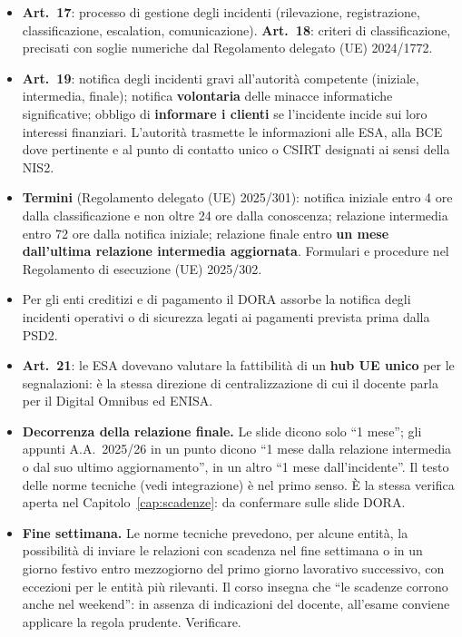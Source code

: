 \begin{integrazione}
\begin{itemize}
  \item \textbf{Art.~17}: processo di gestione degli incidenti (rilevazione, registrazione,
    classificazione, escalation, comunicazione). \textbf{Art.~18}: criteri di classificazione,
    precisati con soglie numeriche dal Regolamento delegato (UE) 2024/1772.
  \item \textbf{Art.~19}: notifica degli incidenti gravi all'autorità competente (iniziale, intermedia,
    finale); notifica \textbf{volontaria} delle minacce informatiche significative; obbligo di
    \textbf{informare i clienti} se l'incidente incide sui loro interessi finanziari. L'autorità
    trasmette le informazioni alle ESA, alla BCE dove pertinente e al punto di contatto unico o CSIRT
    designati ai sensi della NIS2.
  \item \textbf{Termini} (Regolamento delegato (UE) 2025/301): notifica iniziale entro 4 ore dalla
    classificazione e non oltre 24 ore dalla conoscenza; relazione intermedia entro 72 ore dalla
    notifica iniziale; relazione finale entro \textbf{un mese dall'ultima relazione intermedia
    aggiornata}. Formulari e procedure nel Regolamento di esecuzione (UE) 2025/302.
  \item Per gli enti creditizi e di pagamento il DORA assorbe la notifica degli incidenti operativi o
    di sicurezza legati ai pagamenti prevista prima dalla PSD2.
  \item \textbf{Art.~21}: le ESA dovevano valutare la fattibilità di un \textbf{hub UE unico} per le
    segnalazioni: è la stessa direzione di centralizzazione di cui il docente parla per il Digital
    Omnibus ed ENISA.
\end{itemize}
\end{integrazione}

\begin{verifica}
\begin{itemize}
  \item \textbf{Decorrenza della relazione finale.} Le slide dicono solo ``1 mese''; gli appunti
    A.A.~2025/26 in un punto dicono ``1 mese dalla relazione intermedia o dal suo ultimo
    aggiornamento'', in un altro ``1 mese dall'incidente''. Il testo delle norme tecniche (vedi
    integrazione) è nel primo senso. È la stessa verifica aperta nel Capitolo~\ref{cap:scadenze}: da
    confermare sulle slide DORA.
  \item \textbf{Fine settimana.} Le norme tecniche prevedono, per alcune entità, la possibilità di
    inviare le relazioni con scadenza nel fine settimana o in un giorno festivo entro mezzogiorno del
    primo giorno lavorativo successivo, con eccezioni per le entità più rilevanti. Il corso insegna che
    ``le scadenze corrono anche nel weekend'': in assenza di indicazioni del docente, all'esame
    conviene applicare la regola prudente. Verificare.
\end{itemize}
\end{verifica}

